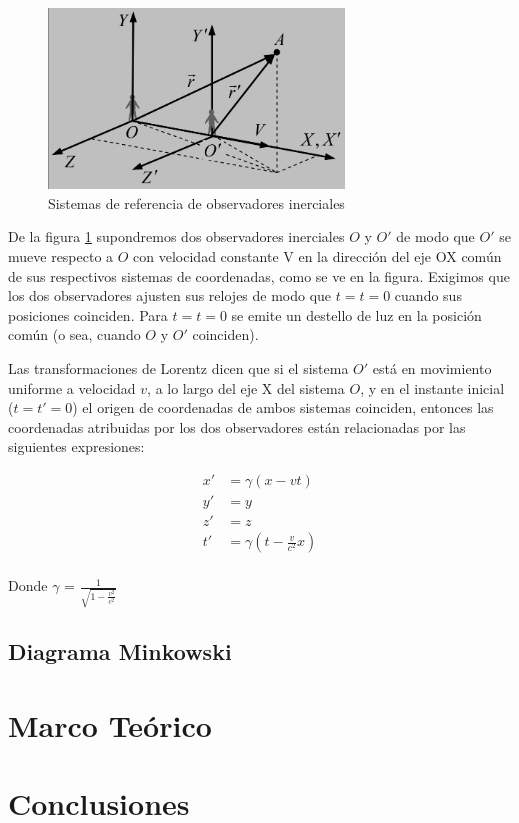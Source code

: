 \documentclass[12pt,twoside]{rif}
\begin{document}
\begin{figure}[h!]
	\centering
	\includegraphics[width=0.7\textwidth]{img/LORENTZ.PNG}
	\caption{Sistemas de referencia de observadores inerciales }
	\label{fig:02}
	\end{figure}
	


De la figura \ref*{fig:02}	supondremos dos observadores inerciales $O$ y $O'$ de modo que $O'$ se mueve respecto a $O$ con velocidad constante V en la dirección del eje OX común de sus respectivos sistemas de coordenadas, como se ve en la figura. Exigimos 
que los dos observadores ajusten sus relojes de modo que $t = t = 0$ cuando sus posiciones coinciden.
Para $t = t = 0$ se emite un destello de luz en la
posición común (o sea, cuando $O$ y $O'$ coinciden). 

Las transformaciones de Lorentz dicen que si el sistema $O'$
está en movimiento uniforme a velocidad  $v$, a lo largo del eje X del sistema $O$, y 
en el instante inicial ($t=t'=0$) el origen 
de coordenadas de ambos sistemas coinciden, entonces las coordenadas atribuidas por los 
dos observadores están relacionadas por las siguientes expresiones:
	
\begin{align*}
	x'&=\gamma(x-vt)\\
	y'&=y\\
	z'&=z\\
	t'&=\gamma(t-\frac{v}{c^{2}}x)\\
\end{align*}

Donde $\gamma$ = $\frac{1}{\sqrt{1-\frac{v^{2}}{c^{2}}}}$
	
	
	\subsection{Diagrama Minkowski}
	
	
	
	\section{Marco Teórico}

	
		
	\section{Conclusiones}
	
	\nocite{*}
	
	
	
\end{document}
